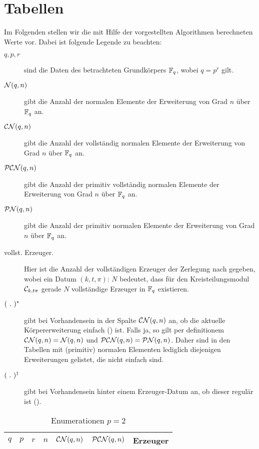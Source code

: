 \chapter{Tabellen}

Im Folgenden stellen wir die mit Hilfe der vorgestellten Algorithmen
berechneten Werte vor. Dabei ist folgende Legende zu beachten:
\begin{description}
  \item[$q, p,r$] sind die Daten des betrachteten Grundkörpers $\F_q$, wobei
    $q = p^r$ gilt.
  \item[$\cal N(q,n)$] gibt die Anzahl der normalen Elemente
    der Erweiterung von Grad $n$ über $\F_q$ an.
  \item[$\CN(q,n)$] gibt die Anzahl der vollständig normalen Elemente
    der Erweiterung von Grad $n$ über $\F_q$ an.
  \item[$\PCN(q,n)$] gibt die Anzahl der primitiv vollständig normalen Elemente 
    der Erweiterung von Grad $n$ über $\F_q$ an.
  \item[$\PN(q,n)$] gibt die Anzahl der primitiv normalen Elemente 
    der Erweiterung von Grad $n$ über $\F_q$ an.
  \item[\normalfont vollst. Erzeuger.] Hier ist die Anzahl der vollständigen Erzeuger
    der Zerlegung nach  gegeben, wobei ein Datum
    $(k,t,\pi):\, N$ bedeutet, dass für den Kreisteilungsmodul 
    $\C_{k,t\pi}$ gerade $N$ vollständige Erzeuger in $\F_q$ existieren.
  \item[$(\speq.)^\ast$] gibt bei Vorhandensein in der Spalte $\CN(q,n)$ an, 
    ob die aktuelle Körpererweiterung einfach () ist.
    Falls ja, so gilt per definitionem 
    $\CN(q,n) = \cal N(q,n)$ und $\PCN(q,n) = \PN(q,n)$.
    Daher sind in den Tabellen mit (primitiv) normalen Elementen lediglich
    diejenigen Erweiterungen gelistet, die nicht einfach sind.
  \item[$(\speq.)^\dagger$] gibt bei Vorhandensein hinter einem Erzeuger-Datum
    an, ob dieser regulär ist ().
\end{description}

\begin{longtable}{llllllp{7cm}}
  \caption{Enumerationen $p=2$}\\
  $q$ & $p$ & $r$ & $n$ & $\CN(q,n)$ & $\PCN(q,n)$ & Erzeuger \\\hline
  \endhead
  
\end{longtable}

